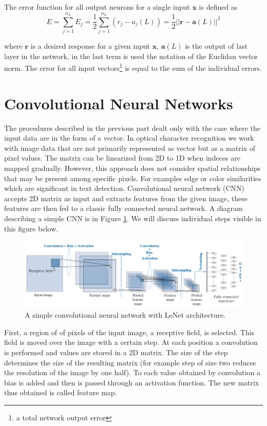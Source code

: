The error function for all output neurons for a single input $\bm{x}$ is defined as
\begin{equation} E = \sum_{j=1} ^{n_L} E_j = \frac{1}{2}\sum_{j=1} ^{n_L} (r_j-a_j(L)) = \frac{1}{2} ||\bm{r} - \bm{a}(L)||^2 \end{equation}

where $\bm{r}$ is a desired response for a given input $\bm{x}$, $\bm{a}(L)$ is the output of last layer in the network, in the last term is used the notation of the Euclidan vector norm. The error for all input vectors\footnote{a total  network output error} is equal to the sum of the individual errors. \cite{DIP}

\section{Convolutional Neural Networks}

The procedures described in the previous part dealt only with the case where the input data are in the form of a vector. In optical character recognition we work with image data that are not primarily represented as vector but as a matrix of pixel values. The matrix can be linearized from 2D to 1D when indeces are mapped gradually. However,  this approach does not consider spatial relationships that may be present among specific pixels. For examples edge or color similarities which are significant in text detection. Convolutional neural network (CNN) accepts 2D matrix as input and extracts features from the given image, these features are then fed to a classic fully connected neural network. A diagram describing  a simple CNN is in Figure \ref*{img:CNN}. We will discuss individual steps visible in this figure below.

\begin{figure}[hbtp]
    \centering
    \includegraphics[scale=0.4]{obrazky/CNN.png}

    \caption{A simple convolutional neural network with LeNet architecture.\cite{DIP}}
    \label{img:CNN}
\end{figure}

First, a region of of pixels of the input image, a receptive field,  is selected. This field is moved over the image with a certain step. At each position a convolution is performed and values are stored in a 2D matrix. The size of the step determines the size of the resulting matrix (for example step of size two reduces the resolution of the image by one half). To each value obtained by convolution a bias is added and then is passed through an activation function. The new matrix thus obtained is called feature map.








